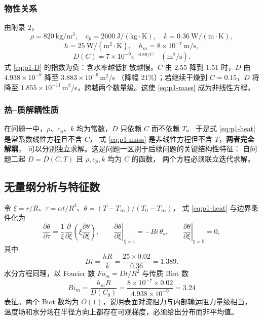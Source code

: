\documentclass[12pt,a4paper]{ctexart}
\begin{document}
\subsubsection{物性关系}

由附录 2，
\begin{equation}
  \rho=820\ \mathrm{kg/m^3},\quad
  c_p=2600\ \mathrm{J/(kg\cdot K)},\quad
  k=0.36\ \mathrm{W/(m\cdot K)},
\end{equation}
\begin{equation}
  h=25\ \mathrm{W/(m^2\cdot K)},\quad
  h_m=8\times10^{-7}\ \mathrm{m/s},
\end{equation}
\begin{equation}
  D(C)=7\times10^{-9}e^{-0.89/C}\quad(\mathrm{m^2/s}).
  \label{eq:p1-D}
\end{equation}
式 \eqref{eq:p1-D} 的指数为负：含水率越低扩散越慢。$C$ 由 $2.55$ 降到
$1.51$ 时，$D$ 由 $4.938\times10^{-9}$ 降至 $3.883\times10^{-9}$\,m$^2$/s
（降幅 $21\%$）；若继续干燥到 $C=0.15$，$D$ 将降至
$1.855\times10^{-11}$\,m$^2$/s，跨越两个数量级。这使 \eqref{eq:p1-mass}
成为非线性方程。

\subsubsection{热--质解耦性质}

在问题一中，$\rho$、$c_p$、$k$ 均为常数，$D$ 只依赖 $C$ 而不依赖 $T$。
于是式 \eqref{eq:p1-heat} 是常系数线性方程且不含 $C$，
式 \eqref{eq:p1-mass} 是非线性方程但不含 $T$，\textbf{两者完全解耦}，
可以分别独立求解。这是问题一区别于后续问题的关键结构性特征：
自问题二起 $D=D(C,T)$ 且 $\rho,c_p,k$ 均为 $C$ 的函数，
两个方程必须联立迭代求解。

\subsection{无量纲分析与特征数}

令 $\xi=r/R$、$\tau=\alpha t/R^2$、$\theta=(T-T_\infty)/(T_0-T_\infty)$，
式 \eqref{eq:p1-heat} 与边界条件化为
\begin{equation}
  \frac{\partial\theta}{\partial\tau}
  =\frac{1}{\xi}\frac{\partial}{\partial\xi}
   \left(\xi\frac{\partial\theta}{\partial\xi}\right),\qquad
  \left.\frac{\partial\theta}{\partial\xi}\right|_{\xi=1}
  =-Bi\,\theta_s,\qquad
  \left.\frac{\partial\theta}{\partial\xi}\right|_{\xi=0}=0,
\end{equation}
其中
\begin{equation}
  Bi=\frac{hR}{k}=\frac{25\times0.02}{0.36}=1.389 .
\end{equation}
水分方程同理，以 Fourier 数 $Fo_m=Dt/R^2$ 与传质 Biot 数
\begin{equation}
  Bi_m=\frac{h_mR}{D(C_0)}=\frac{8\times10^{-7}\times0.02}{4.938\times10^{-9}}
  =3.24
\end{equation}
表征。两个 Biot 数均为 $O(1)$，说明表面对流阻力与内部输运阻力量级相当，
温度场和水分场在半径方向上都存在可观梯度，必须给出分布而非平均值。
\end{document}

